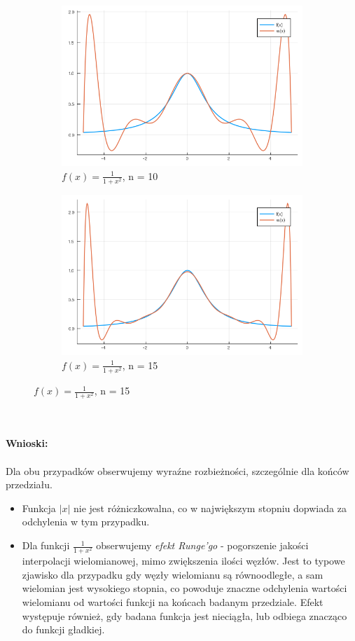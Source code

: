 \documentclass{article}
\begin{document}
\begin{figure}[ht]
	\begin{subfigure}{.5\textwidth}
		\centering
		\includegraphics[width=.8\linewidth]{plots/6_5.png}  
		\caption*{$f(x) = \frac{1}{1+x^2}$, n = 10}
	\end{subfigure}
	\begin{subfigure}{.5\textwidth}
		\centering
		\includegraphics[width=.8\linewidth]{plots/6_6.png}  
		\caption*{$f(x) = \frac{1}{1+x^2}$, n = 15}
	\end{subfigure}
\end{figure}\\\\
\newpage
\noindent \textbf{Wnioski: } \\\\
Dla obu przypadków obserwujemy wyraźne rozbieżności, szczególnie dla końców przedziału.
\begin{itemize}
	\item Funkcja $|x|$ nie jest różniczkowalna, co w największym stopniu dopwiada za odchylenia w tym przypadku.
	\item Dla funkcji $\frac{1}{1+x^2}$ obserwujemy \textit{efekt Runge'go} - pogorszenie jakości interpolacji wielomianowej, mimo zwiększenia ilości węzłów. Jest to typowe zjawisko dla przypadku gdy węzły wielomianu są równoodległe, a sam wielomian jest wysokiego stopnia, co powoduje znaczne odchylenia wartości wielomianu od wartości funkcji na końcach badanym przedziale. Efekt występuje również, gdy badana funkcja jest nieciągła, lub odbiega znacząco do funkcji gładkiej.
\end{itemize}
\end{document}
